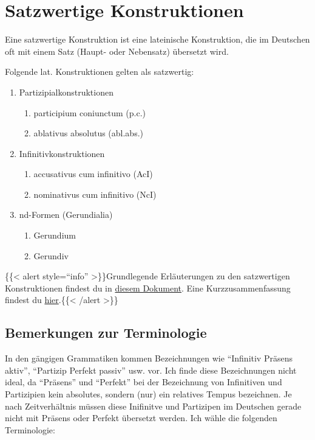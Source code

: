 \documentclass{scrartcl}
\begin{document}
\section{Satzwertige Konstruktionen}
\label{sec:org2d5517a}
Eine satzwertige Konstruktion ist eine lateinische Konstruktion, die
im Deutschen oft mit einem Satz (Haupt- oder Nebensatz) übersetzt
wird.

Folgende lat. Konstruktionen gelten als satzwertig:

\begin{enumerate}
\item Partizipialkonstruktionen
\begin{enumerate}
\item participium coniunctum (p.c.)
\item ablativus absolutus (abl.abs.)
\end{enumerate}
\item Infinitivkonstruktionen
\begin{enumerate}
\item accusativus cum infinitivo (AcI)
\item nominativus cum infinitivo (NcI)
\end{enumerate}
\item nd-Formen (Gerundialia)
\begin{enumerate}
\item Gerundium
\item Gerundiv
\end{enumerate}
\end{enumerate}


\{\{< alert style="`info"' >\}\}Grundlegende Erläuterungen zu den satzwertigen Konstruktionen findest du in \href{https://www.dropbox.com/s/k0ti2cgg8m66et7/Satzwertige\_Konstruktionen.pdf?dl=0}{diesem Dokument}. Eine Kurzzusammenfassung findest du \href{https://www.dropbox.com/s/v87gtz2q3sikbyz/Satzwertige\_Konstruktionen\_SuS.pdf?dl=0}{hier}.\{\{< /alert >\}\}

\subsection{Bemerkungen zur Terminologie}
\label{sec:orgc5d7d21}

In den gängigen Grammatiken kommen Bezeichnungen wie "`Infinitiv Präsens aktiv"', "`Partizip Perfekt passiv"' usw. vor. Ich finde diese Bezeichnungen nicht ideal, da "`Präsens"' und "`Perfekt"' bei der Bezeichnung von Infinitiven und Partizipien kein absolutes, sondern (nur) ein relatives Tempus bezeichnen. Je nach Zeitverhältnis müssen diese Inifinitve und Partizipen im Deutschen gerade nicht mit Präsens oder Perfekt übersetzt werden. Ich wähle die folgenden Terminologie:
\end{document}
